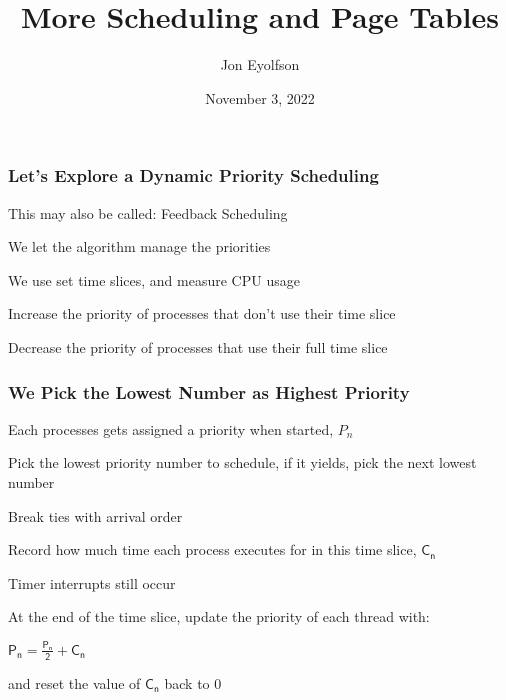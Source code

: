 

\title{More Scheduling and Page Tables}
\author{Jon Eyolfson}
\date{November 3, 2022}


  \begin{frame}
    \titlepage
  \end{frame}

  \begin{frame}
    \frametitle{Let's Explore a Dynamic Priority Scheduling}

    This may also be called: Feedback Scheduling

    \vspace{2em}

    We let the algorithm manage the priorities

    \hspace{2em} We use set time slices, and measure CPU usage

    \vspace{2em}

    Increase the priority of processes that don't use their time slice

    \vspace{2em}

    Decrease the priority of processes that use their full time slice
  \end{frame}

  \begin{frame}
    \frametitle{We Pick the Lowest Number as Highest Priority}

    Each processes gets assigned a priority when started, $P_n$

    \vspace{2em}

    Pick the lowest priority number to schedule, if it yields, pick the
    next lowest number

    \hspace{2em} Break ties with arrival order

    \vspace{2em}

    Record how much time each process executes for in this time slice,
    $\mathsf{C_n}$

    \hspace{2em} Timer interrupts still occur
  
    \vspace{2em}

    At the end of the time slice, update the priority of each thread with:

    \hspace{2em} $\mathsf{P_n =  \frac{P_n}{2} + C_n}$ 

    \hspace{2em} and reset the value of $\mathsf{C_n}$ back to 0
  \end{frame}


